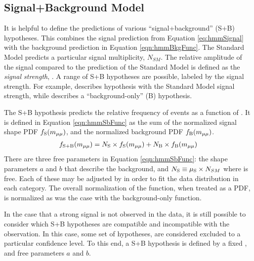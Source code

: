 \subsection{Signal+Background Model}

It is helpful to define the predictions of various ``signal+background'' (S+B) hypotheses.
This combines the signal prediction from Equation \ref{eq:hmmSignal} with the background prediction in Equation \ref{eqn:hmmBkgFunc}.
The Standard Model predicts a particular signal multiplicity, $N_{SM}$.
The relative amplitude of the signal compared to the prediction of the Standard Model is defined as the \emph{signal strength}, \mus.
A range of S+B hypotheses are possible, labeled by the signal strength.
For example,  describes hypothesis with the Standard Model signal strength, while  describes a ``background-only'' (B) hypothesis.

The S+B hypothesis predicts the relative frequency of events as a function of \muu.
It is defined in Equation \ref{eqn:hmmSbFunc} as the sum of the normalized signal shape PDF $f_\text{S}(m_{\mu\mu})$, and the normalized background PDF $f_\text{B}(m_{\mu\mu})$.
\begin{equation}\begin{split}\label{eqn:hmmSbFunc}
f_\text{S+B}(m_{\mu\mu}) = N_\text{S}\times f_\text{S}(m_{\mu\mu}) + N_\text{B}\times f_\text{B}(m_{\mu\mu})
\end{split}\end{equation} 
There are three free parameters in Equation \ref{eqn:hmmSbFunc}: the shape parameters $a$ and $b$ that describe the background, and $N_\text{S}\equiv\mu_\text{S}\times N_{SM}$ where \mus is free.
Each of these may be adjusted by  in order to fit the data distribution in each category.
The overall normalization of the function, when treated as a PDF, is normalized as was the case with the background-only function.

In the case that a strong signal is not observed in the data, it is still possible to consider which S+B hypotheses are compatible and incompatible with the observation.
In this case, some set of hypotheses, are considered excluded to a particular confidence level.
To this end, a S+B hypothesis is defined by a fixed \mus, and free parameters $a$ and $b$.
